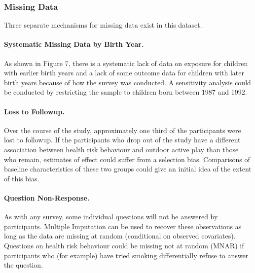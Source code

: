 \documentclass [11pt]{article}
\begin{document}
\subsubsection{Missing Data}

Three separate mechanisms for missing data exist in this dataset. 
\paragraph{Systematic Missing Data by Birth Year.} As shown in Figure 7, there is a systematic lack of data on exposure for children with earlier birth years and a lack of some outcome data for children with later birth years because of how the survey was conducted. A sensitivity analysis could be conducted by restricting the sample to children born between 1987 and 1992.
\paragraph{Loss to Followup.} Over the course of the study, approximately one third of the participants were lost to followup. If the participants who drop out of the study have a different association between health risk behaviour and outdoor active play than those who remain, estimates of effect could suffer from a selection bias. Comparisons of baseline characteristics of these two groups could give an initial idea of the extent of this bias. 
\paragraph{Question Non-Response.} As with any survey, some individual questions will not be answered by participants. Multiple Imputation can be used to recover these observations as long as the data are missing at random (conditional on observed covariates). Questions on health risk behaviour could be missing not at random (MNAR) if participants who (for example) have tried smoking differentially refuse to answer the question. 
\noindent


\end{document}
